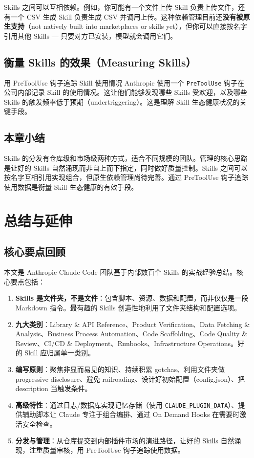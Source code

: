 \documentclass[a4paper]{article}
\begin{document}
Skills 之间可以互相依赖。例如，你可能有一个文件上传 Skill 负责上传文件，还有一个 CSV 生成 Skill 负责生成 CSV 并调用上传。这种依赖管理目前还\textbf{没有被原生支持}（not natively built into marketplaces or skills yet），但你可以直接按名字引用其他 Skills --- 只要对方已安装，模型就会调用它们。

\subsection{衡量 Skills 的效果（Measuring Skills）}

\begin{importantbox}{用 PreToolUse 钩子追踪 Skill 使用情况}
Anthropic 使用一个 \texttt{PreToolUse} 钩子在公司内部记录 Skill 的使用情况。这让他们能够发现哪些 Skills 受欢迎，以及哪些 Skills 的触发频率低于预期（undertriggering）。这是理解 Skill 生态健康状况的关键手段。
\end{importantbox}

\subsection{本章小结}

Skills 的分发有仓库级和市场级两种方式，适合不同规模的团队。管理的核心思路是让好的 Skills 自然涌现而非自上而下指定，同时做好质量控制。Skills 之间可以按名字互相引用实现组合，但原生依赖管理尚待完善。通过 PreToolUse 钩子追踪使用数据是衡量 Skill 生态健康的有效手段。

\section{总结与延伸}

\subsection{核心要点回顾}

本文是 Anthropic Claude Code 团队基于内部数百个 Skills 的实战经验总结。核心要点包括：

\begin{enumerate}
    \item \textbf{Skills 是文件夹，不是文件}：包含脚本、资源、数据和配置，而非仅仅是一段 Markdown 指令。最有趣的 Skills 创造性地利用了文件夹结构和配置选项。
    \item \textbf{九大类别}：Library \& API Reference、Product Verification、Data Fetching \& Analysis、Business Process Automation、Code Scaffolding、Code Quality \& Review、CI/CD \& Deployment、Runbooks、Infrastructure Operations。好的 Skill 应归属单一类别。
    \item \textbf{编写原则}：聚焦非显而易见的知识、持续积累 gotchas、利用文件夹做 progressive disclosure、避免 railroading、设计好初始配置（config.json）、把 description 当触发条件。
    \item \textbf{高级特性}：通过日志/数据库实现记忆存储（使用 \texttt{CLAUDE\_PLUGIN\_DATA}）、提供辅助脚本让 Claude 专注于组合编排、通过 On Demand Hooks 在需要时激活安全检查。
    \item \textbf{分发与管理}：从仓库提交到内部插件市场的演进路径，让好的 Skills 自然涌现，注重质量审核，用 PreToolUse 钩子追踪使用数据。
\end{enumerate}
\end{document}
